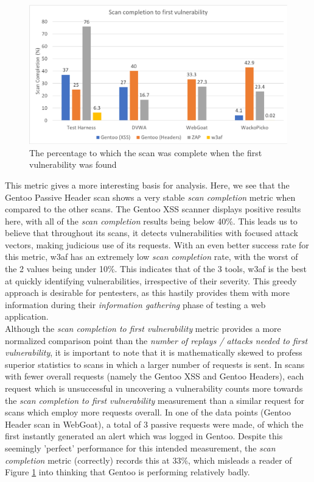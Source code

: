  \begin{figure}[h!]
 	\centering
 	\includegraphics[width=\textwidth]{images/evaluation/scan_completion_first_vuln.png}
 	\caption{The percentage to which the scan was complete when the first vulnerability was found}
 	\label{fig:scan_completion_first_vuln}
 \end{figure}
 
 This metric gives a more interesting basis for analysis. Here, we see that the Gentoo Passive Header scan shows a very stable \textit{scan completion} metric when compared to the other scans. The Gentoo XSS scanner displays positive results here, with all of the \textit{scan completion} results being below 40\%. This leads us to believe that throughout its scans, it detects vulnerabilities with focused attack vectors, making judicious use of its requests. With an even better success rate for this metric, w3af has an extremely low \textit{scan completion} rate, with the worst of the 2 values being under 10\%. This indicates that of the 3 tools, w3af is the best at quickly identifying vulnerabilities, irrespective of their severity. This greedy approach is desirable for pentesters, as this hastily provides them with more information during their \textit{information gathering} phase of testing a web application. \\
 
 Although the \textit{scan completion to first vulnerability} metric provides a more normalized comparison point than the \textit{number of replays / attacks needed to first vulnerability}, it is important to note that it is mathematically skewed to profess superior statistics to scans in which a larger number of requests is sent. In scans with fewer overall requests (namely the Gentoo XSS and Gentoo Headers), each request which is unsuccessful in uncovering a vulnerability counts more towards the \textit{scan completion to first vulnerability} measurement than a similar request for scans which employ more requests overall. In one of the data points (Gentoo Header scan in WebGoat), a total of 3 passive requests were made, of which the first instantly generated an alert which was logged in Gentoo. Despite this seemingly 'perfect' performance for this intended measurement, the \textit{scan completion} metric (correctly) records this at 33\%, which misleads a reader of Figure \ref{fig:scan_completion_first_vuln} into thinking that Gentoo is performing relatively badly. \\
 
